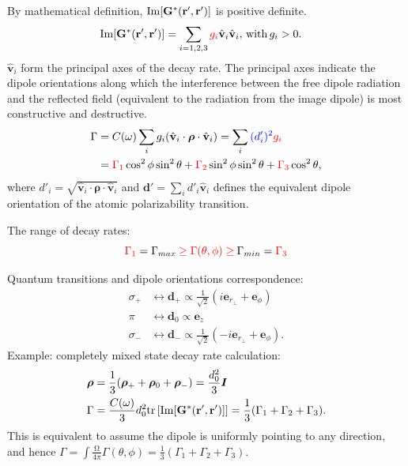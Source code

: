 \documentclass[preprint,aps,pra,onecolumn]{revtex4-1} %
\begin{document}
By mathematical definition, $\mathrm{Im}[\mathbf{G}^{*}(\mathbf{r}',\mathbf{r}')]$ is positive definite. 
\begin{align}
\mathrm{Im}[\mathbf{G}^{*}(\mathbf{r}',\mathbf{r}')] &= \sum_{i=1,2,3} \mathbin{\color{red}{g_i}}\hat{\mathbf{v}}_i\hat{\mathbf{v}}_i,\,\text{with}\, g_i>0.
\end{align}
$\hat{\mathbf{v}}_i$ form the principal axes of the decay rate. The principal axes indicate the dipole orientations along which the interference between the free dipole radiation and the reflected field (equivalent to the radiation from the image dipole) is most constructive and destructive.   
\begin{align}
\Gamma &= C(\omega)\sum_i g_i(\hat{\mathbf{v}}_i\cdot \boldsymbol{\rho}\cdot \hat{\mathbf{v}}_i) 
= \sum_i \mathbin{\color{blue}{(d'_i)^2}} \mathbin{\color{red}{g_i}} \\
&= \mathbin{\color{red}{\Gamma_1}}\cos^2\phi\sin^2\theta+\mathbin{\color{red}{\Gamma_2}}\sin^2\phi\sin^2\theta+\mathbin{\color{red}{\Gamma_3}}\cos^2\theta,
\end{align}
where $ d'_i=\sqrt{\hat{\mathbf{v}}_i\cdot \boldsymbol{\rho}\cdot \hat{\mathbf{v}}_i}$ and $\mathbf{d}'=\sum_i d'_i\hat{\mathbf{v}}_i$ defines the equivalent dipole orientation of the atomic polarizability transition.

The range of decay rates:
$$\mathbin{\color{red}{\Gamma_1}}=\Gamma_{max}\mathbin{\color{red}{\ge \Gamma (\theta,\phi) \ge}} \Gamma_{min}=\mathbin{\color{red}{\Gamma_3}}$$

Quantum transitions and dipole orientations correspondence:
\begin{align}
\sigma_+ &\leftrightarrow \mathbf{d}_+\propto \frac{1}{\sqrt{2}}(i\mathbf{e}_{r\!_\perp}+\mathbf{e}_\phi)\\
\pi &\leftrightarrow \mathbf{d}_0 \propto \mathbf{e}_z\\
\sigma_- &\leftrightarrow \mathbf{d}_-\propto \frac{1}{\sqrt{2}}(-i\mathbf{e}_{r\!_\perp}+\mathbf{e}_\phi).
\end{align}
Example: completely mixed state decay rate calculation:
\begin{align}
\boldsymbol{\rho} &=\frac{1}{3}(\boldsymbol{\rho}_++\boldsymbol{\rho}_0+\boldsymbol{\rho}_-)=\frac{d_0^2}{3}\boldsymbol{I}\\
\Gamma &=\frac{C(\omega)}{3}d_0^2 \mathrm{tr}\left[ \mathrm{Im}[\mathbf{G}^*(\mathbf{r}',\mathbf{r}')] \right]=\frac{1}{3}(\Gamma_1+\Gamma_2+\Gamma_3).
\end{align}
This is equivalent to assume the dipole is uniformly pointing to any direction, and hence
$\Gamma = \int \frac{\mathrm{\Omega}}{4\pi}\Gamma(\theta,\phi)=\frac{1}{3}(\Gamma_1+\Gamma_2+\Gamma_3)$.
\end{document}
